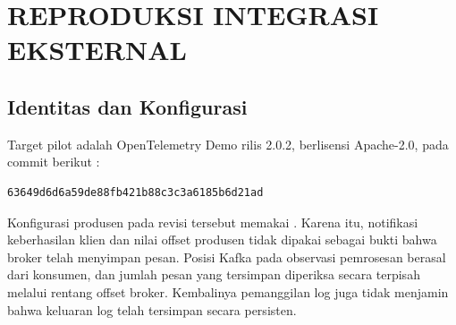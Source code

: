 \chapter{REPRODUKSI INTEGRASI EKSTERNAL}
\label{app:external}
\section{Identitas dan Konfigurasi}
Target pilot adalah OpenTelemetry Demo rilis 2.0.2, berlisensi Apache-2.0, pada commit berikut \citep{oteldemo2025}:
\begin{lstlisting}
63649d6d6a59de88fb421b88c3c3a6185b6d21ad
\end{lstlisting}
Konfigurasi produsen pada revisi tersebut memakai . Karena itu, notifikasi keberhasilan klien dan nilai offset produsen tidak dipakai sebagai bukti bahwa broker telah menyimpan pesan. Posisi Kafka pada observasi pemrosesan berasal dari konsumen, dan jumlah pesan yang tersimpan diperiksa secara terpisah melalui rentang offset broker. Kembalinya pemanggilan log juga tidak menjamin bahwa keluaran log telah tersimpan secara persisten.

